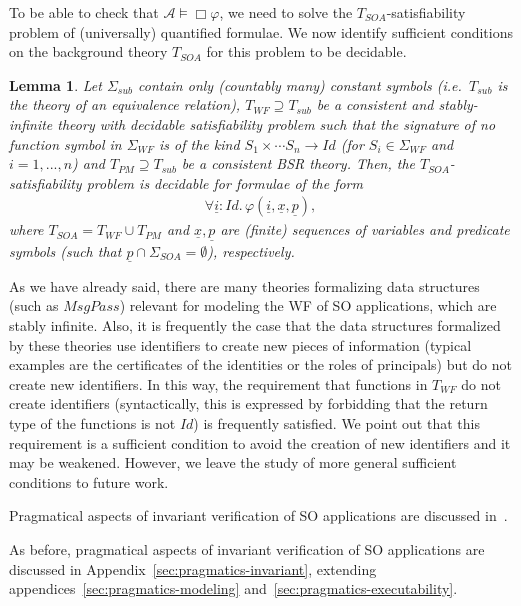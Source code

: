 \documentclass[conference]{IEEEtran}
\newtheorem{lemma}{Lemma}
\newcommand{\close}{\IEEEQEDclosed}
\begin{document}
To be able to check that $\mathcal{A} \models \Box \varphi$, we need
to solve the $T_\mathit{SOA}$-satisfiability problem of (universally)
quantified formulae.  We now identify sufficient conditions on the
background theory $T_\mathit{SOA}$ for this problem to be decidable.
\begin{lemma}
  \label{th:dec-SOA-sat-univ}
  Let $\Sigma_\mathit{sub}$ contain only (countably many) constant symbols
  (i.e.\ $T_\mathit{sub}$ is the theory of an equivalence relation), $T_\mathit{WF}
  \supseteq T_\mathit{sub}$ be a consistent and stably-infinite theory with
  decidable satisfiability problem such that the signature of no
  function symbol in $\Sigma_\mathit{WF}$ is of the kind $S_1 \times \cdots
  S_n \rightarrow \mathit{Id}$ (for $S_i \in \Sigma_\mathit{WF}$ and
  $i=1,...,n$) and $T_\mathit{PM} \supseteq T_\mathit{sub}$ be a consistent BSR
  theory.  Then, the $T_\mathit{SOA}$-satisfiability problem is decidable for
  formulae of the form
  \begin{eqnarray*}
    \forall \underline{i}:\mathit{Id}.\,
     \varphi(\underline{i},\underline{x},\underline{p}) ,
  \end{eqnarray*}
  where $T_\mathit{SOA}= T_\mathit{WF}\cup T_\mathit{PM}$ and $\underline{x},\underline{p}$
  are (finite) sequences of variables and predicate symbols (such that
  $\underline{p} \cap \Sigma_\mathit{SOA}=\emptyset$), respectively.
  \hfill \close
\end{lemma}

As we have already said, there are many theories formalizing data
structures (such as $\mathit{MsgPass}$) relevant
for modeling the WF of SO applications, which are stably
infinite.  Also, it is frequently the case that the data structures
formalized by these theories use identifiers to create new pieces of
information (typical examples are the certificates of the identities or
the roles of principals) but do not create new identifiers.  In this
way, the requirement that functions in $T_\mathit{WF}$ do not create
identifiers (syntactically, this is expressed by forbidding that the
return type of the functions is not $\mathit{Id}$) is frequently
satisfied.  We point out that this requirement is a sufficient
condition to avoid the creation of new identifiers and it may be
weakened.  However, we leave the study of more general sufficient
conditions to future work. 
\begin{SHORT}
Pragmatical aspects of invariant verification of SO applications are
discussed in~\cite{BRV-TR09}.
\end{SHORT}
\begin{LONG}
As before, pragmatical aspects of invariant verification of SO applications are
discussed in Appendix~\ref{sec:pragmatics-invariant}, extending
appendices~\ref{sec:pragmatics-modeling} and~\ref{sec:pragmatics-executability}.
\end{LONG}
\end{document}
